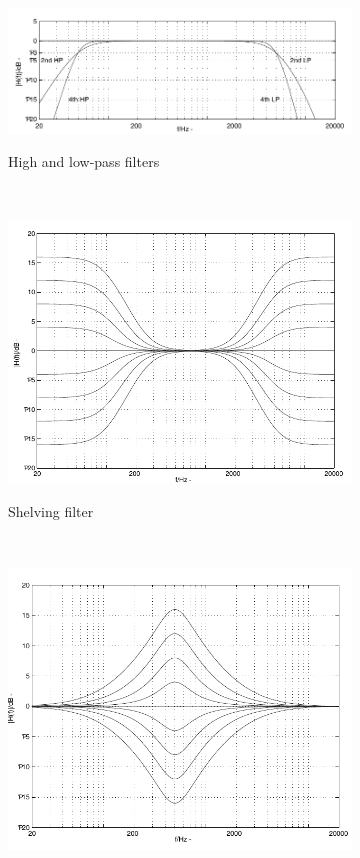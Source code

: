 \documentclass[a4paper,twoside,12pt]{book}
\begin{document}
\begin{figure}[H]
    \centering
    \begin{subfigure}[t]{0.8\textwidth}
        \includegraphics[width=\textwidth]{images/filter_pass}
        \label{fig:pass}
        \caption{High and low-pass filters}
    \end{subfigure}
    ~
    \begin{subfigure}[t]{0.4\textwidth}
        \includegraphics[width=\textwidth]{images/filter_shelving}
        \label{fig:shelf}
        \caption{Shelving filter}
    \end{subfigure}
    ~
    \begin{subfigure}[t]{0.4\textwidth}
        \includegraphics[width=\textwidth]{images/filter_peak}

\end{subfigure}
\end{figure}
\end{document}
